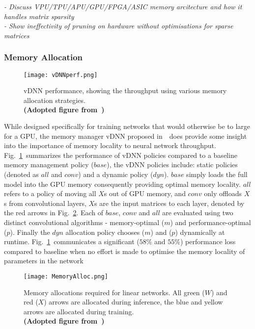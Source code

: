 \documentclass[../../D1.tex]{subfiles}
\begin{document}
\emph{
- Discuss VPU/TPU/APU/GPU/FPGA/ASIC memory arcitecture and how it handles matrix sparsity\\
- Show ineffectivity of pruning on hardware without optimisations for sparse matrices\\
}


\subsubsection{Memory Allocation}\label{sec:MemAlloc}
\begin{figure}[H]
    \texttt{[image: vDNNperf.png]} 
    \caption{vDNN performance, showing the throughput using various memory allocation strategies. \\ \textbf{(Adopted figure from~\autocite{rhuVDNNVirtualizedDeep2016})}}
    \label{fig:vDNNperf}   
\end{figure}
While designed specifically for training networks that would otherwise be to large for a GPU, the memory manager vDNN proposed in~\autocite{rhuVDNNVirtualizedDeep2016}~does provide some insight into the importance of memory locality to neural network throughput.
Fig.~\ref{fig:vDNNperf}~summarizes the performance of vDNN policies compared to a baseline memory management policy ($base$), the vDNN policies include: static policies (denoted as $all$ and $conv$) and a dynamic policy ($dyn$).
$base$ simply loads the full model into the GPU memory consequently providing optimal memory locality. $all$ refers to a policy of moving all $X$s out of GPU memory, and $conv$ only offloads $X$s from convolutional layers, $X$s are the input matrices to each layer, denoted by the red arrows in Fig.~\ref{fig:memAllocInf}.
Each of $base$, $conv$ and $all$ are evaluated using two distinct convolutional algorithms - memory-optimal ($m$) and performance-optimal ($p$).
Finally the $dyn$ allocation policy chooses ($m$) and ($p$) dynamically at runtime.
Fig.~\ref{fig:vDNNperf}~communicates a significant ($58\%$ and $55\%$) performance loss compared to baseline when no effort is made to optimise the memory locality of parameters in the network 

\begin{figure}[H]
    \texttt{[image: MemoryAlloc.png]} 
    \caption{Memory allocations required for linear networks. All green ($W$) and red ($X$) arrows are allocated during inference, the blue and yellow arrows are allocated during training.\\ \textbf{(Adopted figure from~\autocite{rhuVDNNVirtualizedDeep2016})}}
    \label{fig:memAllocInf}   
\end{figure}
\end{document}
